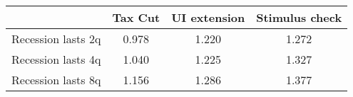 \begin{tabular}{@{}lccc@{}} 
\toprule 
& Tax Cut    & UI extension    & Stimulus check    \\  \midrule 
Recession lasts 2q &0.978  & 1.220  & 1.272     \\ 
Recession lasts 4q &1.040  & 1.225  & 1.327     \\ 
Recession lasts 8q &1.156  & 1.286  & 1.377     \\ 
\end{tabular}  
